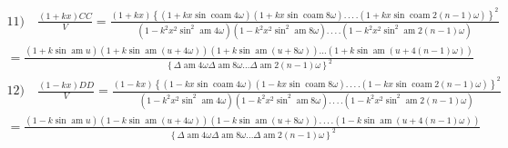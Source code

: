 \documentclass{article}
\begin{document}
\[
\begin{gathered}
\text{11)}\quad\frac{(1+kx)CC}{V}=\frac{(1+kx)\left\{\left(1+kx\sin\operatorname{coam}4\omega\right)\left(1+kx\sin\operatorname{coam}8\omega\right).\,.\,.\,.\left(1+kx\sin\operatorname{coam}2(n-1)\omega\right)\right\}^{2}}{\left(1-k^{2}x^{2}\sin^{2}\operatorname{am}4\omega\right)\left(1-k^{2}x^{2}\sin^{2}\operatorname{am}8\omega\right).\,.\,.\,.\left(1-k^{2}x^{2}\sin^{2}\operatorname{am}2(n-1)\omega\right)}\\[1.5ex]
=\frac{\left(1+k\sin\operatorname{am}u\right)\left(1+k\sin\operatorname{am}(u+4\omega)\right)\left(1+k\sin\operatorname{am}(u+8\omega)\right)\ldots\left(1+k\sin\operatorname{am}(u+4(n-1)\omega)\right)}{\left\{\Delta\operatorname{am}4\omega\Delta\operatorname{am}8\omega\ldots\Delta\operatorname{am}2(n-1)\omega\right\}^{2}}
\end{gathered}
\]
\[
\begin{gathered}
\text{12)}\quad\frac{(1-kx)DD}{V}=\frac{(1-kx)\left\{\left(1-kx\sin\operatorname{coam}4\omega\right)\left(1-kx\sin\operatorname{coam}8\omega\right).\,.\,.\,.\left(1-kx\sin\operatorname{coam}2(n-1)\omega\right)\right\}^{2}}{\left(1-k^{2}x^{2}\sin^{2}\operatorname{am}4\omega\right)\left(1-k^{2}x^{2}\sin^{2}\operatorname{am}8\omega\right).\,.\,.\,.\left(1-k^{2}x^{2}\sin^{2}\operatorname{am}2(n-1)\omega\right)}\\[1.5ex]
=\frac{\left(1-k\sin\operatorname{am}u\right)\left(1-k\sin\operatorname{am}(u+4\omega)\right)\left(1-k\sin\operatorname{am}(u+8\omega)\right).\,.\,.\,.\left(1-k\sin\operatorname{am}(u+4(n-1)\omega)\right)}{\left\{\Delta\operatorname{am}4\omega\Delta\operatorname{am}8\omega\ldots\Delta\operatorname{am}2(n-1)\omega\right\}^{2}}
\end{gathered}
\]
\end{document}
